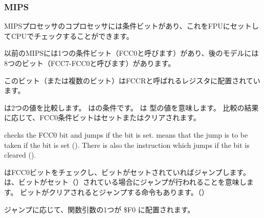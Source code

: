 ﻿\subsubsection{MIPS}

MIPSプロセッサのコプロセッサには条件ビットがあり、これをFPUにセットしてCPUでチェックすることができます。

以前のMIPSには1つの条件ビット（FCC0と呼びます）があり、後のモデルには8つのビット（FCC7-FCC0と呼びます）があります。

このビット（または複数のビット）はFCCRと呼ばれるレジスタに配置されています。



は2つの値を比較します。 
はの条件です。
は \Tdouble 型の値を意味します。 
比較の結果に応じて、FCC0条件ビットはセットまたはクリアされます。

 checks the FCC0 bit and jumps if the bit is set.
 means that the jump is to be taken if the bit is set ().
There is also the instruction  which jumps if the bit is cleared ().

はFCC0ビットをチェックし、ビットがセットされていればジャンプします。 
は、ビットがセット（）されている場合にジャンプが行われることを意味します。 
ビットがクリアされるとジャンプする命令もあります。（）

ジャンプに応じて、関数引数の1つが \$F0 に配置されます。
